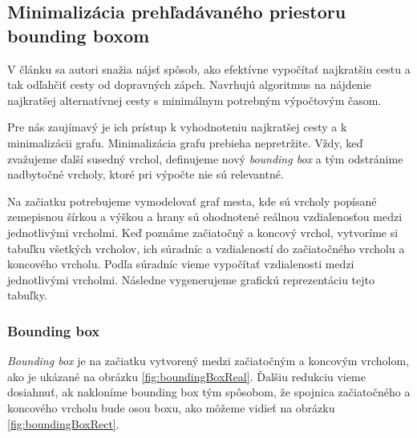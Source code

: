 \subsection{Minimalizácia prehľadávaného priestoru bounding boxom}
V článku \cite{alternate} sa autori snažia nájsť spôsob, ako efektívne vypočítať najkratšiu cestu a tak odľahčiť cesty od dopravných zápch. Navrhujú algoritmus na nájdenie najkratšej alternatívnej cesty s minimálnym potrebným výpočtovým časom. 

Pre nás zaujímavý je ich prístup k vyhodnoteniu najkratšej cesty a k minimalizácii grafu. Minimalizácia grafu prebieha nepretržite. Vždy, keď zvažujeme ďalší susedný vrchol, definujeme nový \textit{bounding box} a tým odstránime nadbytočné vrcholy, ktoré pri výpočte nie sú relevantné.

Na začiatku potrebujeme vymodelovať graf mesta, kde sú vrcholy popísané zemepisnou šírkou a výškou a hrany sú ohodnotené reálnou vzdialenosťou medzi jednotlivými vrcholmi. Keď poznáme začiatočný a koncový vrchol, vytvoríme si tabuľku všetkých vrcholov, ich súradníc a vzdialeností do začiatočného vrcholu a koncového vrcholu. Podľa súradníc vieme vypočítať vzdialenosti medzi jednotlivými vrcholmi. Následne vygenerujeme grafickú reprezentáciu tejto tabuľky. 

\subsubsection{Bounding box}
\textit{Bounding box} je na začiatku vytvorený medzi začiatočným a koncovým vrcholom, ako je ukázané na obrázku \ref{fig:boundingBoxReal}. Ďalšiu redukciu vieme dosiahnuť, ak nakloníme bounding box tým spôsobom, že spojnica začiatočného a koncového vrcholu bude osou boxu, ako môžeme vidieť na obrázku \ref{fig:boundingBoxRect}. 

